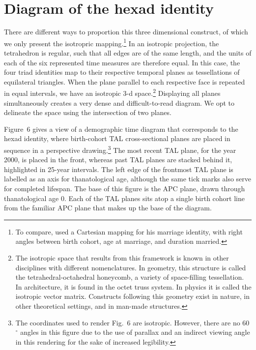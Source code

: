 \documentclass{bmcart}
\theoremstyle{definition}
\begin{document}
 \section{Diagram of the hexad identity}
 \label{sec:diagram}
 There are different ways to proportion this three dimensional construct,
of which we only present the isotropric mapping.\footnote{To compare,
\citet{lexis1875einleitung} used a Cartesian mapping for his marriage identity,
with right angles between birth cohort, age at marriage, and duration married.}
In an isotropic projection, the tetrahedron is regular, such that all edges are
of the same length, and the units of each of the six represented time measures
are therefore equal. In this case, the four triad identities map to
their respective temporal planes as tessellations of equilateral triangles. When
the plane parallel to each respective face is repeated in equal intervals, we
have an isotropic 3-d space.\footnote{The isotropic space that results from this framework is known in other disciplines with different nomenclatures. In geometry, this structure is called the tetrahedral-octahedral honeycomb, a variety of space-filling tessellation. In
architecture, it is found in the octet truss system. In physics it is called
the isotropic vector matrix. Constructs following this geometry exist in nature,
in other theoretical settings, and in man-made structures.}
Displaying all planes simultaneously creates a very dense and difficult-to-read
diagram. We opt to delineate the space using the intersection of two planes.

Figure~6 gives a view of a demographic
time diagram that corresponds to the hexad identity, where birth-cohort TAL
cross-sectional planes are placed in sequence in a perspective drawing.\footnote{The coordinates used to render Fig.~6 are isotropic.
However, there are no 60$^\circ$ angles in this figure due to the use of
parallax and an indirect viewing angle in this rendering for the sake of
increased legibility.} The most recent TAL plane, for the year 2000, is placed
in the front, whereas past TAL planes are stacked behind it, highlighted in
25-year intervals. The left edge of the frontmost TAL plane is labelled as an
axis for thanatological age, although the same tick marks also serve for
completed lifespan.
The base of this figure is the APC plane, drawn through thanatological age 0.
Each of the TAL planes sits atop a single birth cohort line from the familiar
APC plane that makes up the base of the diagram.
\end{document}
